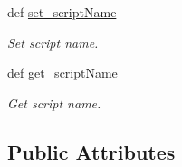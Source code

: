 \begin{DoxyCompactItemize}
def \hyperlink{classlmf_1_1src_1_1core_1_1form__representation_1_1_form_representation_ae3e8092f467c8971142c38888765e6c3}{set\+\_\+script\+Name}
\begin{DoxyCompactList}\small\item\em Set script name. \end{DoxyCompactList}\item 
def \hyperlink{classlmf_1_1src_1_1core_1_1form__representation_1_1_form_representation_a19be12afb3fb0678bb3c0aa9a9831d55}{get\+\_\+script\+Name}
\begin{DoxyCompactList}\small\item\em Get script name. \end{DoxyCompactList}\end{DoxyCompactItemize}
\subsection*{Public Attributes}
